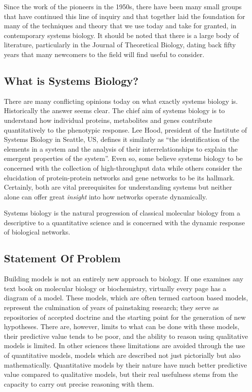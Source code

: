 Since the work of the pioneers in the 1950s, there have been many small
groups that have continued this line of inquiry and that together laid
the foundation for many of the techniques and theory that we use today
and take for granted, in contemporary systems biology. It should be
noted that there is a large body of literature, particularly in the
Journal of Theoretical Biology, dating back fifty years that many
newcomers to the field will find useful to consider.

\subsection{What is Systems Biology?}

There are many conflicting opinions today on what exactly systems
biology is. Historically the answer seems clear. The chief aim of
systems biology is to understand how individual proteins, metabolites
and genes contribute quantitatively to the phenotypic response. Lee
Hood, president of the Institute of Systems Biology in Seattle, US,
defines it similarly as ``the identification of the elements in a system
and the analysis of their interrelationships to explain the emergent
properties of the system''. Even so, some believe systems biology to be
concerned with the collection of high-throughput data while others
consider the elucidation of protein-protein networks and gene networks
to be its hallmark. Certainly, both are vital prerequisites for
understanding systems but neither alone can offer great \emph{insight}
into how networks operate dynamically.

Systems biology is the natural progression of classical molecular
biology from a descriptive to a quantitative science and is concerned
with the dynamic response of biological networks.

\subsection{Statement Of Problem}

Building models is not an entirely new approach to biology. If one
examines any text book on molecular biology or biochemistry, virtually
every page has a diagram of a model. These models, which are often
termed cartoon based models, represent the culmination of years of
painstaking research; they serve as repositories of accepted doctrine
and the starting point for the generation of new hypotheses. There are,
however, limits to what can be done with these models, their predictive
value tends to be poor, and the ability to reason using qualitative
models is limited. In other sciences these limitations are avoided
through the use of quantitative models, models which are described not
just pictorially but also mathematically. Quantitative models by their
nature have much better predictive value compared to qualitative models,
but their real usefulness stems from the capacity to carry out precise
reasoning with them.

